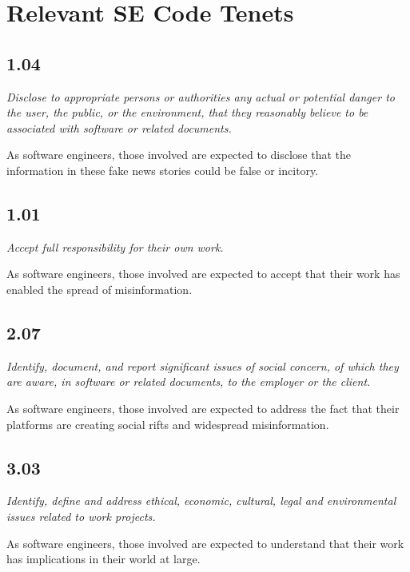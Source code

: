 
\section{Relevant SE Code Tenets}

\subsection{1.04}

\emph{Disclose to appropriate persons or authorities any actual or potential danger to the user, the public, or the environment, that they reasonably believe to be associated with software or related documents.}

As software engineers, those involved are expected to disclose that the information in these fake news stories could be false or incitory.

\subsection{1.01}

\emph{Accept full responsibility for their own work.}

As software engineers, those involved are expected to accept that their work has enabled the spread of misinformation.

\subsection{2.07}

\emph{Identify, document, and report significant issues of social concern, of which they are aware, in software or related documents, to the employer or the client.}

As software engineers, those involved are expected to address the fact that their platforms are creating social rifts and widespread misinformation.

\subsection{3.03}

\emph{Identify, define and address ethical, economic, cultural, legal and environmental issues related to work projects.}

As software engineers, those involved are expected to understand that their work has implications in their world at large.

